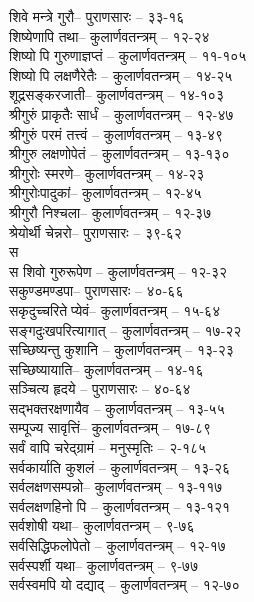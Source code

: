 \begin{raggedright}
\begin{parcolumns}[colwidths={1=.55\textwidth,2=.55\textwidth}]{2}
{शिवे मन्त्रे गुरौ– 	पुराणसारः   – ३३-१६\\
शिष्येणापि तथा– 	कुलार्णवतन्त्रम्  – १२-२४\\
शिष्योपि गुरुणाज्ञप्तं	– 	कुलार्णवतन्त्रम्  – ११-१०५\\
शिष्योपि लक्षणैरेतैः	– 	कुलार्णवतन्त्रम्  – १४-२५\\
शूद्रसङ्करजाती– 	कुलार्णवतन्त्रम्  – १४-१०३\\
श्रीगुरुं  प्राकृतैः सार्धं	– 	कुलार्णवतन्त्रम्  – १२-४७\\
श्रीगुरुं परमं तत्त्वं –  कुलार्णवतन्त्रम्  – १३-४९\\
श्रीगुरु लक्षणोपेतं	– 	कुलार्णवतन्त्रम्  – १३-१३०\\
श्रीगुरोः स्मरणे– 	कुलार्णवतन्त्रम्  – १४-२३\\
श्रीगुरोःपादुकां– 	कुलार्णवतन्त्रम्  – १२-४५\\
श्रीगुरौ निश्चला– 	कुलार्णवतन्त्रम्  – १२-३७\\
श्रेयोर्थी चेन्नरो– 	पुराणसारः   – ३९-६२\\
{\large स}\\
स शिवो गुरुरूपेण	– 	कुलार्णवतन्त्रम्  – १२-३२\\
सकुण्डमण्डपा– 	पुराणसारः   – ४०-६६\\
सकृदुच्चरितेप्येवं– 	कुलार्णवतन्त्रम्  – १५-६४\\
सङ्गदुःखपरित्यागात्	– 	कुलार्णवतन्त्रम्  – १७-२२\\
सच्छिष्यन्तु कुशानि	– 	कुलार्णवतन्त्रम्  – १३-२३\\
सच्छिष्यायाति– 	कुलार्णवतन्त्रम्  – १४-१६\\
सञ्चित्य हृदये	– 	पुराणसारः   – ४०-६४\\
सद्भक्तरक्षणायैव	  – 	कुलार्णवतन्त्रम्  – १३-५५\\
सम्पूज्य सावृत्तिं– 	 कुलार्णवतन्त्रम्  – १७-८९\\
सर्वं वापि चरेद्ग्रामं	– 	मनुस्मृतिः  – २-१८५\\
सर्वकार्याति कुशलं	– 	कुलार्णवतन्त्रम्  – १३-२६\\
सर्वलक्षणसम्पन्नो– 	कुलार्णवतन्त्रम्  – १३-११७\\
सर्वलक्षणहिनोपि	– 	कुलार्णवतन्त्रम्  – १३-१२१\\
सर्वशोषी यथा–  कुलार्णवतन्त्रम्  – ९-७६\\
सर्वसिद्धिफलोपेतो	– 	कुलार्णवतन्त्रम्  – १२-१७\\
सर्वस्पर्शी यथा– 	कुलार्णवतन्त्रम्  – ९-७७\\
सर्वस्वमपि यो दद्याद्	– 	कुलार्णवतन्त्रम्  – १२-७०\\
}
\end{parcolumns}
\end{raggedright}
